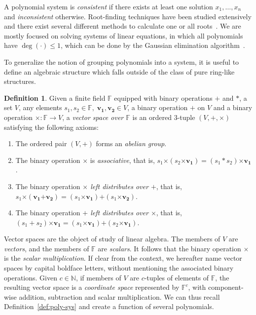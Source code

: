 \documentclass[12pt, a4paper, oneside]{memoir}
\theoremstyle{definition}
\newtheorem{definition}[theorem]{Definition}
\begin{document}
A polynomial system is \emph{consistent} if there exists at least one solution $x_{1}, \dots, x_{n}$ and \emph{inconsistent} otherwise. Root-finding techniques have been studied extensively and there exist several different methods to calculate one or all roots~\cite[Chapter 9]{Press:2007}. We are mostly focused on solving systems of linear equations, in which all polynomials have $\deg(\cdot) \leq 1$, which can be done by the Gaussian elimination algorithm~\cite[Section 2.2]{Press:2007}.

To generalize the notion of grouping polynomials into a system, it is useful to define an algebraic structure which falls outside of the class of pure ring-like structures.

\begin{definition}
  Given a finite field $\mathbb{F}$ equipped with binary operations $+$ and $\ast$, a set $V$, any elements $s_{1}, s_{2} \in \mathbb{F},\; \mathbf{v_{1}}, \mathbf{v_{2}} \in V$, a binary operation $\bm{+}$ on $V$ and a binary operation $\bm{\times} : \mathbb{F} \to V$, a \emph{vector space over $\mathbb{F}$} is an ordered $3$-tuple $(V, \bm{+}, \bm{\times})$ satisfying the following axioms:
  
  \begin{enumerate}
    \item The ordered pair $(V, \bm{+})$ forms an \emph{abelian group}.
    \item The binary operation $\bm{\times}$ is \emph{associative}, that is, $s_{1} \bm{\times} (s_{2} \bm{\times} \mathbf{v_{1}}) = (s_{1} \ast s_{2}) \bm{\times} \mathbf{v_{1}}$.
    \item The binary operation \emph{$\bm{\times}$ left distributes over $\bm{+}$}, that is, $s_{1} \bm{\times} (\mathbf{v_{1}} \bm{+} \mathbf{v_{2}}) = (s_{1} \bm{\times} \mathbf{v_{1}}) \bm{+} (s_{1} \bm{\times} \mathbf{v_{2}})$.
    \item The binary operation \emph{$\bm{+}$ left distributes over $\bm{\times}$}, that is, $(s_{1} + s_{2}) \bm{\times} \mathbf{v_{1}} = (s_{1} \bm{\times} \mathbf{v_{1}}) \bm{+} (s_{2} \bm{\times} \mathbf{v_{1}})$.
  \end{enumerate}
\end{definition}

Vector spaces are the object of study of linear algebra. The members of $V$ are \emph{vectors}, and the members of $\mathbb{F}$ are \emph{scalars}. It follows that the binary operation $\bm{\times}$ is the \emph{scalar multiplication}. If clear from the context, we hereafter name vector spaces by capital boldface letters, without mentioning the associated binary operations. Given $c \in \mathbb{N}$, if members of $V$ are $c$-tuples of elements of $\mathbb{F}$, the resulting vector space is a \emph{coordinate space} represented by $\mathbb{F}^{c}$, with component-wise addition, subtraction and scalar multiplication. We can thus recall Definition~\ref{def:poly-sys} and create a function of several polynomials.
\end{document}
